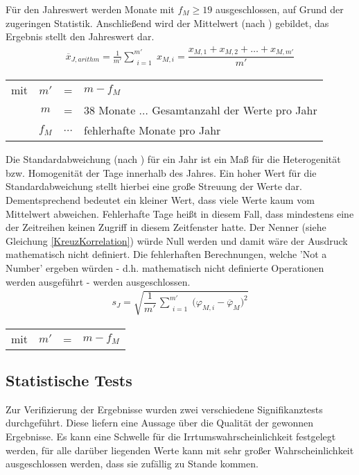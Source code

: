 \documentclass[fontsize=11pt, twoside, a4paper]{scrartcl}
\begin{document}
Für den Jahreswert werden Monate mit $f_{M} \geqslant 19$ ausgeschlossen, auf Grund der zugeringen Statistik. Anschließend wird der Mittelwert (nach \cite{TaschenbuchMathematik}) gebildet, das Ergebnis stellt den Jahreswert dar. 
\begin{align}
\overline{x}_{J,arithm} = \frac{1}{m'} \sum_{\substack{i=1}}^{m'} x_{M,i} = \dfrac{x_{M,1}+x_{M,2}+ \ldots +x_{M,m'}}{m'}
\end{align}
\begin{table}[H]
\begin{tabular}{rccl}
mit  & $m'$ & = & $m - f_{M}$\\
	 & $m$ & = & 38 Monate $\ldots$ Gesamtanzahl der Werte pro Jahr\\
	 & $f_{M}$ & $\ldots$ & fehlerhafte Monate pro Jahr\\
\end{tabular}
\end{table}
Die Standardabweichung (nach \cite{TaschenbuchStatistik}) für ein Jahr ist ein Maß für die Heterogenität bzw. Homogenität der Tage innerhalb des Jahres. Ein hoher Wert für die Standardabweichung stellt hierbei eine große Streuung der Werte dar. Dementsprechend bedeutet ein kleiner Wert, dass viele Werte kaum vom Mittelwert abweichen. Fehlerhafte Tage heißt in diesem Fall, dass mindestens eine der Zeitreihen keinen Zugriff in diesem Zeitfenster hatte. Der Nenner (siehe Gleichung \ref{KreuzKorrelation}) würde Null werden und damit wäre der Ausdruck mathematisch nicht definiert. Die fehlerhaften Berechnungen, welche 'Not a Number' ergeben würden - d.h. mathematisch nicht definierte Operationen werden ausgeführt - werden ausgeschlossen.
\begin{align}
s_{J} = \sqrt{\dfrac{1}{m'}\,\sum_{\substack{i=1}}^{m'} \bigl( \varphi_{M,i}-\overline{\varphi}_{M}\bigr)^{2}}
\label{Standardabweichung}
\end{align}
\begin{table}[H]
\begin{tabular}{rccl}
mit  & $m'$ & = & $m - f_{M}$\\
\end{tabular}
\end{table}


\subsection{Statistische Tests}
Zur Verifizierung der Ergebnisse wurden zwei verschiedene Signifikanztests durchgeführt. Diese liefern eine Aussage über die Qualität der gewonnen Ergebnisse. Es kann eine Schwelle für die Irrtumswahrscheinlichkeit festgelegt werden, für alle darüber liegenden Werte kann mit sehr großer Wahrscheinlichkeit ausgeschlossen werden, dass sie zufällig zu Stande kommen.
\end{document}
